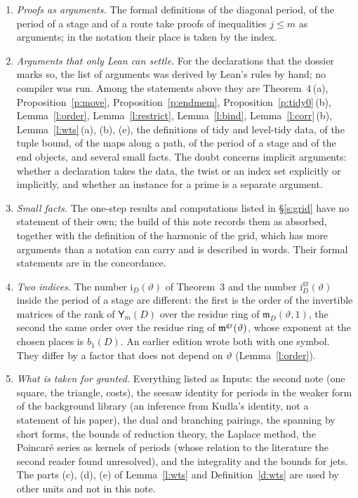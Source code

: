 \documentclass[11pt,a4paper]{article}
\theoremstyle{plainx}
\theoremstyle{uprightx}
\newcommand{\sY}{\mathsf{Y}}
\newcommand{\fm}{\mathfrak{m}}
\begin{document}
\begin{enumerate}[label=\textup{\arabic*.},leftmargin=1.6em,itemsep=5pt]
(Definition~\ref{d:paths}\,(b), (c)) the tool that reads the statements takes the arrow of the type ``linear
map'' for a premise. In the Lean text these definitions take the tuple, the flag and the indices and return a
linear map; here the form to which the map is applied fills the last slot of the notation.
\item \emph{Proofs as arguments.} The formal definitions of the diagonal period, of the period of a stage and of
a route take proofs of inequalities $j\le m$ as arguments; in the notation their place is taken by the index.
\item \emph{Arguments that only Lean can settle.} For the declarations that the dossier marks so, the list of
arguments was derived by Lean's rules by hand; no compiler was run. Among the statements above they are
Theorem~4\,(a), Proposition~\ref{p:move}, Proposition~\ref{p:endmem}, Proposition~\ref{p:tidy0}\,(b),
Lemma~\ref{l:order}, Lemma~\ref{l:restrict}, Lemma~\ref{l:bind}, Lemma~\ref{l:corr}\,(b),
Lemma~\ref{l:wts}\,(a), (b), (e), the definitions of tidy and level-tidy data, of the tuple bound, of the maps
along a path, of the period of a stage and of the end objects, and several small facts. The doubt concerns
implicit arguments: whether a declaration takes the data, the twist or an index set explicitly or implicitly,
and whether an instance for a prime is a separate argument.
\item \emph{Small facts.} The one-step results and computations listed in §\ref{s:grid} have no statement of
their own; the build of this note records them as absorbed, together with the definition of the harmonic of the
grid, which has more arguments than a notation can carry and is described in words. Their formal statements are
in the concordance.
\item \emph{Two indices.} The number $\mathrm{i}_D(\vartheta)$ of Theorem~3 and the number
$\mathrm{i}^{\mathrm{gr}}_D(\vartheta)$ inside the period of a stage are different: the first is the order of the
invertible matrices of the rank of $\sY_m(D)$ over the residue ring of $\fm_D(\vartheta,1)$, the second the same
order over the residue ring of $\mathfrak{m}^{\mathrm{gr}}(\vartheta)$, whose exponent at the chosen places is $b_1(D)$. An
earlier edition wrote both with one symbol. They differ by a factor that does not depend on $\vartheta$
(Lemma~\ref{l:order}).
\item \emph{What is taken for granted.} Everything listed as Inputs: the second note (one square, the triangle,
costs), the seesaw identity for periods in the weaker form of the background library (an inference from Kudla's
identity, not a statement of his paper), the dual and branching pairings, the spanning by short forms, the bounds
of reduction theory, the Laplace method, the Poincaré series as kernels of periods (whose relation to the
literature the second reader found unresolved), and the integrality and the bounds for jets. The parts (c), (d), (e) of Lemma~\ref{l:wts} and Definition~\ref{d:wts} are used by
other units and not in this note.
\end{enumerate}
\end{document}
